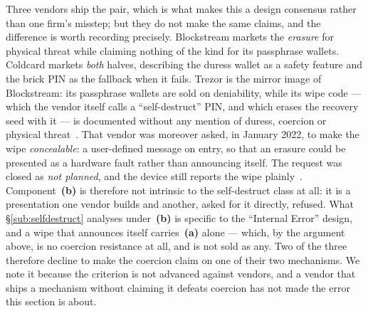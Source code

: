 \begin{remark}
\label{rem:vendor-claims}
Three vendors ship the pair, which is what makes this a design consensus rather
than one firm's misstep; but they do not make the same claims, and the
difference is worth recording precisely. Blockstream markets the \emph{erasure}
for physical threat while claiming nothing of the kind for its passphrase
wallets. Coldcard markets \emph{both} halves, describing the duress wallet as a
safety feature and the brick PIN as the fallback when it fails. Trezor is the
mirror image of Blockstream: its passphrase wallets are sold on deniability,
while its wipe code --- which the vendor itself calls a ``self-destruct'' PIN,
and which erases the recovery seed with it --- is documented without any mention
of duress, coercion or physical threat~\cite{trezor-wipe-code}. That vendor was
moreover asked, in January 2022, to make the wipe \emph{concealable}: a
user-defined message on entry, so that an erasure could be presented as a
hardware fault rather than announcing itself. The request was closed as \emph{not
planned}, and the device still reports the wipe
plainly~\cite{trezor-wipe-deniability}. Component~\textbf{(b)} is therefore
not intrinsic to the self-destruct class at all: it is a presentation one vendor
builds and another, asked for it directly, refused. What \S\ref{sub:selfdestruct}
analyses under~\textbf{(b)} is specific to the ``Internal Error'' design, and
a wipe that announces itself carries~\textbf{(a)} alone --- which, by the
argument above, is no coercion resistance at all, and is not sold as any. Two of the three
therefore decline to make the coercion claim on one of their two mechanisms. We
note it because the criterion is not advanced against vendors, and a vendor that
ships a mechanism without claiming it defeats coercion has not made the error
this section is about.
\end{remark}

